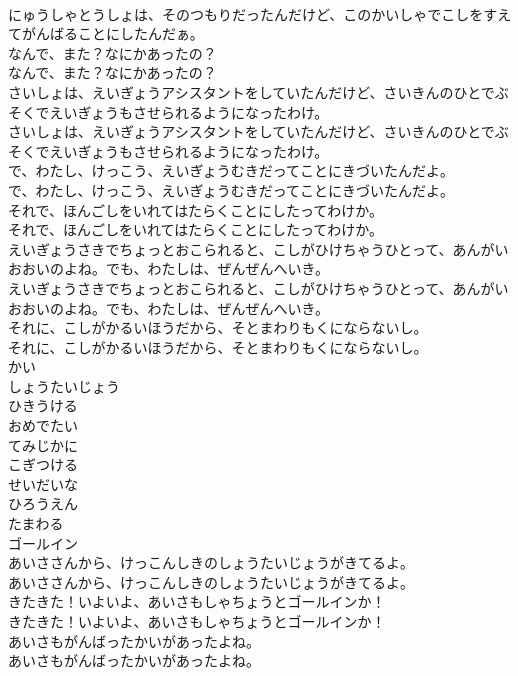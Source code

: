 \documentclass[8pt]{extreport}
\begin{document}
\begin{CJK}{UTF8}{min}
\\	にゅうしゃとうしょは、そのつもりだったんだけど、このかいしゃでこしをすえてがんばることにしたんだぁ。
\\	なんで、また？なにかあったの？
\\	なんで、また？なにかあったの？
\\	さいしょは、えいぎょうアシスタントをしていたんだけど、さいきんのひとでぶそくでえいぎょうもさせられるようになったわけ。
\\	さいしょは、えいぎょうアシスタントをしていたんだけど、さいきんのひとでぶそくでえいぎょうもさせられるようになったわけ。
\\	で、わたし、けっこう、えいぎょうむきだってことにきづいたんだよ。
\\	で、わたし、けっこう、えいぎょうむきだってことにきづいたんだよ。
\\	それで、ほんごしをいれてはたらくことにしたってわけか。
\\	それで、ほんごしをいれてはたらくことにしたってわけか。
\\	えいぎょうさきでちょっとおこられると、こしがひけちゃうひとって、あんがいおおいのよね。でも、わたしは、ぜんぜんへいき。
\\	えいぎょうさきでちょっとおこられると、こしがひけちゃうひとって、あんがいおおいのよね。でも、わたしは、ぜんぜんへいき。
\\	それに、こしがかるいほうだから、そとまわりもくにならないし。
\\	それに、こしがかるいほうだから、そとまわりもくにならないし。
\\	かい
\\	しょうたいじょう
\\	ひきうける
\\	おめでたい
\\	てみじかに
\\	こぎつける
\\	せいだいな
\\	ひろうえん
\\	たまわる
\\	ゴールイン
\\	あいささんから、けっこんしきのしょうたいじょうがきてるよ。
\\	あいささんから、けっこんしきのしょうたいじょうがきてるよ。
\\	きたきた！いよいよ、あいさもしゃちょうとゴールインか！
\\	きたきた！いよいよ、あいさもしゃちょうとゴールインか！
\\	あいさもがんばったかいがあったよね。
\\	あいさもがんばったかいがあったよね。

\end{CJK}
\end{document}

